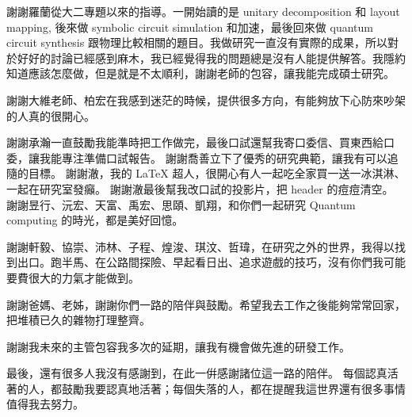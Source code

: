 
\begin{acknowledgement}

謝謝羅蘭從大二專題以來的指導。一開始讀的是 unitary decomposition 和 layout mapping, 後來做 symbolic circuit simulation 和加速，最後回來做 quantum circuit synthesis 跟物理比較相關的題目。我做研究一直沒有實際的成果，所以對於好好的討論已經感到麻木，我已經覺得我的問題總是沒有人能提供解答。我隱約知道應該怎麼做，但是就是不太順利，謝謝老師的包容，讓我能完成碩士研究。

謝謝大維老師、柏宏在我感到迷茫的時候，提供很多方向，有能夠放下心防來吵架的人真的很開心。

謝謝承瀚一直鼓勵我能準時把工作做完，最後口試還幫我寄口委信、買東西給口委，讓我能專注準備口試報告。
謝謝喬善立下了優秀的研究典範，讓我有可以追隨的目標。
謝謝澈，我的 LaTeX 超人，很開心有人一起吃全家買一送一冰淇淋、一起在研究室發癲。
謝謝澈最後幫我改口試的投影片，把 header 的痘痘清空。
謝謝昱行、沅宏、天富、禹宏、思頤、凱翔，和你們一起研究 Quantum computing 的時光，都是美好回憶。

謝謝軒毅、協崇、沛林、子程、煌浚、琪汶、哲瑋，在研究之外的世界，我得以找到出口。跑半馬、在公路間探險、早起看日出、追求遊戲的技巧，沒有你們我可能要費很大的力氣才能做到。

謝謝爸媽、老姊，謝謝你們一路的陪伴與鼓勵。希望我去工作之後能夠常常回家，把堆積已久的雜物打理整齊。

謝謝我未來的主管包容我多次的延期，讓我有機會做先進的研發工作。

最後，還有很多人我沒有感謝到，在此一倂感謝諸位這一路的陪伴。
每個認真活著的人，都鼓勵我要認真地活著；每個失落的人，都在提醒我這世界還有很多事情值得我去努力。


\end{acknowledgement}